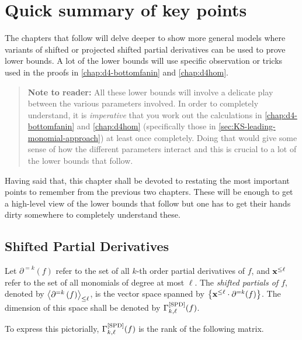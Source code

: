 \chapter{Quick summary of key points}

The chapters that follow will delve deeper to show more general models where variants of shifted or projected shifted partial derivatives can be used to prove lower bounds.
A lot of the lower bounds will use specific observation or tricks used in the proofs in \autoref{chap:d4-bottomfanin} and \autoref{chap:d4hom}. 

\begin{quote}
\begin{mdframed}
{\bf Note to reader:} All these lower bounds will involve a delicate play between the various parameters involved. In order to completely understand, it is \emph{imperative} that you work out the calculations in \autoref{chap:d4-bottomfanin} and \autoref{chap:d4hom} (specifically those in \autoref{sec:KS-leading-monomial-approach}) at least once completely. Doing that would give some sense of how the different parameters interact and this is crucial to a lot of the lower bounds that follow. 
\end{mdframed}
\end{quote}

Having said that, this chapter shall be devoted to restating the most important points to remember from the previous two chapters.
These will be enough to get a high-level view of the lower bounds that follow but one has to get their hands dirty somewhere to completely understand these.

\section{Shifted Partial Derivatives}

\begin{definition*}
  Let $\partial^{=k}(f)$ refer to the set of all $k$-th order partial derivatives of $f$, and $\mathbf{x}^{\leq \ell}$ refer to the set of all monomials of degree at most $\ell$. 
The \emph{shifted partials of $f$}, denoted by $\left\langle\partial^{=k}\left(f\right)\right\rangle_{\leq \ell}$, is the vector space spanned by $\left\{\mathbf{x}^{\leq \ell} \cdot \partial^{=k}(f)\right\}$. 
The dimension of this space shall be denoted by $\Gamma^{\mathrm{[SPD]}}_{k,\ell}(f)$. 
\end{definition*}

\noindent
To express this pictorially, $\Gamma^{\mathrm{[SPD]}}_{k,\ell}(f)$ is the rank of the following matrix. 

